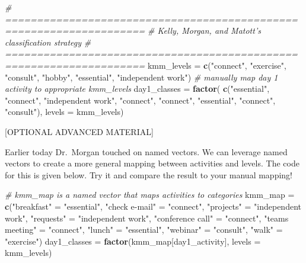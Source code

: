 \documentclass[
]{book}
\newenvironment{Shaded}{\begin{snugshade}}{\end{snugshade}}
\newcommand{\CommentTok}[1]{\textcolor[rgb]{0.56,0.35,0.01}{\textit{#1}}}
\newcommand{\DataTypeTok}[1]{\textcolor[rgb]{0.13,0.29,0.53}{#1}}
\newcommand{\KeywordTok}[1]{\textcolor[rgb]{0.13,0.29,0.53}{\textbf{#1}}}
\newcommand{\NormalTok}[1]{#1}
\newcommand{\StringTok}[1]{\textcolor[rgb]{0.31,0.60,0.02}{#1}}
\begin{document}
\begin{Shaded}
\begin{Highlighting}[]
\CommentTok{# ====================================================================}
\CommentTok{# Kelly, Morgan, and Matott's classification strategy}
\CommentTok{# ====================================================================}
\NormalTok{kmm_levels =}\StringTok{ }\KeywordTok{c}\NormalTok{(}\StringTok{"connect"}\NormalTok{, }
              \StringTok{"exercise"}\NormalTok{, }
              \StringTok{"consult"}\NormalTok{, }
              \StringTok{"hobby"}\NormalTok{, }
              \StringTok{"essential"}\NormalTok{,}
              \StringTok{"independent work"}\NormalTok{)}
\CommentTok{# manually map day 1 activity to appropriate kmm_levels}
\NormalTok{day1_classes =}\StringTok{ }\KeywordTok{factor}\NormalTok{(}
    \KeywordTok{c}\NormalTok{(}\StringTok{"essential"}\NormalTok{, }\StringTok{"connect"}\NormalTok{, }\StringTok{"independent work"}\NormalTok{,}
      \StringTok{"connect"}\NormalTok{, }\StringTok{"connect"}\NormalTok{,  }\StringTok{"essential"}\NormalTok{, }
      \StringTok{"connect"}\NormalTok{, }\StringTok{"consult"}\NormalTok{), }\DataTypeTok{levels =}\NormalTok{ kmm_levels)}
\end{Highlighting}
\end{Shaded}

{[}OPTIONAL ADVANCED MATERIAL{]}

Earlier today Dr.~Morgan touched on named vectors. We can leverage named vectors to create a more general mapping between activities and levels. The code for this is given below. Try it and compare the result to your manual mapping!

\begin{Shaded}
\begin{Highlighting}[]
\CommentTok{# kmm_map is a named vector that maps activities to categories}
\NormalTok{kmm_map =}\StringTok{ }\KeywordTok{c}\NormalTok{(}\StringTok{"breakfast"}\NormalTok{       =}\StringTok{ "essential"}\NormalTok{, }
            \StringTok{"check e-mail"}\NormalTok{    =}\StringTok{ "connect"}\NormalTok{, }
            \StringTok{"projects"}\NormalTok{        =}\StringTok{ "independent work"}\NormalTok{,}
            \StringTok{"requests"}\NormalTok{        =}\StringTok{ "independent work"}\NormalTok{,}
            \StringTok{"conference call"}\NormalTok{ =}\StringTok{ "connect"}\NormalTok{,}
            \StringTok{"teams meeting"}\NormalTok{   =}\StringTok{ "connect"}\NormalTok{, }
            \StringTok{"lunch"}\NormalTok{           =}\StringTok{ "essential"}\NormalTok{, }
            \StringTok{"webinar"}\NormalTok{         =}\StringTok{ "consult"}\NormalTok{,}
            \StringTok{"walk"}\NormalTok{            =}\StringTok{ "exercise"}\NormalTok{)}
\NormalTok{day1_classes =}\StringTok{ }\KeywordTok{factor}\NormalTok{(kmm_map[day1_activity], }\DataTypeTok{levels =}\NormalTok{ kmm_levels)}
\end{Highlighting}
\end{Shaded}
\end{document}
